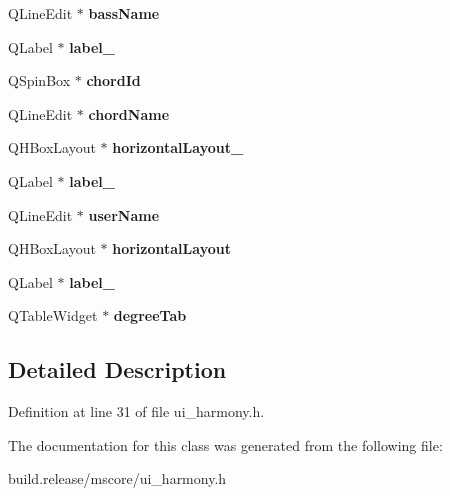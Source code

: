 \begin{DoxyCompactItemize}
Q\+Line\+Edit $\ast$ {\bfseries bass\+Name}
\item 
\mbox{\label{class_ui___harmony_base_a34d3da889024a8119e775611685629da}} 
Q\+Label $\ast$ {\bfseries label\+\_}
\item 
\mbox{\label{class_ui___harmony_base_a5eab89c282387eb83cff68c21f50de49}} 
Q\+Spin\+Box $\ast$ {\bfseries chord\+Id}
\item 
\mbox{\label{class_ui___harmony_base_a4770be6b04bdf3d2a3519a0873e3afec}} 
Q\+Line\+Edit $\ast$ {\bfseries chord\+Name}
\item 
\mbox{\label{class_ui___harmony_base_abbf99ff2dc7890e1f62a3bc1dde69007}} 
Q\+H\+Box\+Layout $\ast$ {\bfseries horizontal\+Layout\+\_}
\item 
\mbox{\label{class_ui___harmony_base_afc6feb2e425393ee8cbc8a33e5abc375}} 
Q\+Label $\ast$ {\bfseries label\+\_}
\item 
\mbox{\label{class_ui___harmony_base_a6069694ff349ad1b975bce66518f4942}} 
Q\+Line\+Edit $\ast$ {\bfseries user\+Name}
\item 
\mbox{\label{class_ui___harmony_base_aba8891e6aae98d6c225e0662e63dd5c4}} 
Q\+H\+Box\+Layout $\ast$ {\bfseries horizontal\+Layout}
\item 
\mbox{\label{class_ui___harmony_base_a9f0497f1576aae9c052ea51042220bcc}} 
Q\+Label $\ast$ {\bfseries label\+\_}
\item 
\mbox{\label{class_ui___harmony_base_a058ee4aa4228346223e3849c8bfc86b5}} 
Q\+Table\+Widget $\ast$ {\bfseries degree\+Tab}
\end{DoxyCompactItemize}


\subsection{Detailed Description}


Definition at line 31 of file ui\+\_\+harmony.\+h.



The documentation for this class was generated from the following file\+:\begin{DoxyCompactItemize}
\item 
build.\+release/mscore/ui\+\_\+harmony.\+h\end{DoxyCompactItemize}
